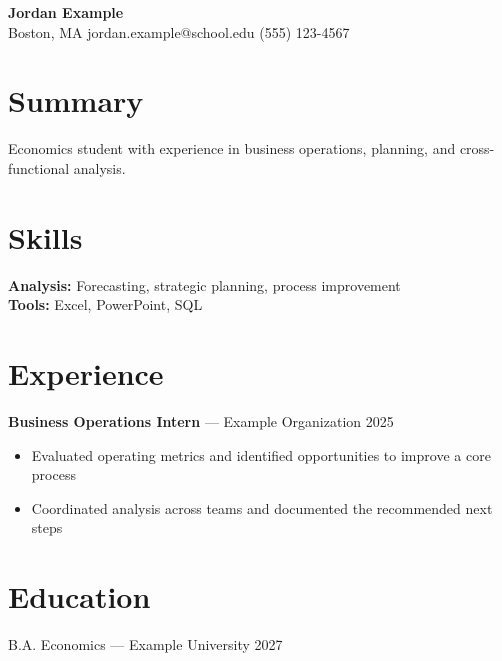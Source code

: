 \documentclass[11pt]{article}
\begin{document}
\begin{center}
{\LARGE \textbf{Jordan Example}} \\
Boston, MA \quad jordan.example@school.edu \quad (555) 123-4567
\end{center}

\section*{Summary}
Economics student with experience in business operations, planning, and cross-functional analysis.

\section*{Skills}
\textbf{Analysis:} Forecasting, strategic planning, process improvement \\
\textbf{Tools:} Excel, PowerPoint, SQL

\section*{Experience}
\textbf{Business Operations Intern} --- Example Organization \hfill 2025 \\
\begin{itemize}[nosep]
  \item Evaluated operating metrics and identified opportunities to improve a core process
  \item Coordinated analysis across teams and documented the recommended next steps
\end{itemize}

\section*{Education}
B.A. Economics --- Example University \hfill 2027
\end{document}
